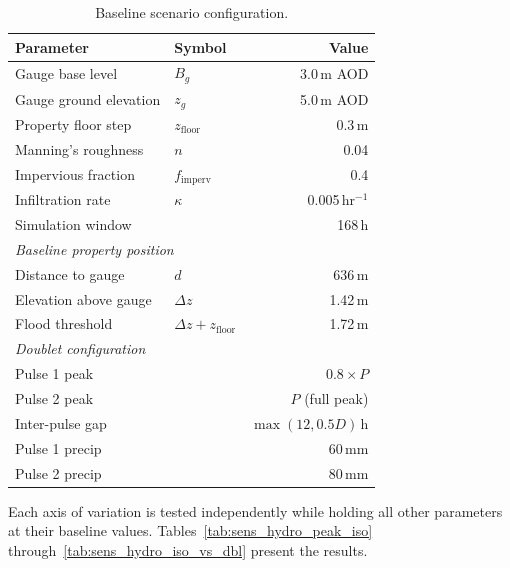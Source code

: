 \documentclass[11pt,a4paper]{article}
\begin{document}
\begin{table}[H]
    \centering
    \caption{Baseline scenario configuration.}
    \label{tab:baseline_config}
    \begin{tabular}{llr}
        \toprule
        \textbf{Parameter} & \textbf{Symbol} & \textbf{Value} \\
        \midrule
        Gauge base level & $B_g$ & 3.0\,m AOD \\
        Gauge ground elevation & $z_g$ & 5.0\,m AOD \\
        Property floor step & $z_{\mathrm{floor}}$ & 0.3\,m \\
        Manning's roughness & $n$ & 0.04 \\
        Impervious fraction & $f_{\mathrm{imperv}}$ & 0.4 \\
        Infiltration rate & $\kappa$ & 0.005\,hr$^{-1}$ \\
        Simulation window & & 168\,h \\
        \midrule
        \multicolumn{3}{l}{\textit{Baseline property position}} \\
        Distance to gauge & $d$ & 636\,m \\
        Elevation above gauge & $\Delta z$ & 1.42\,m \\
        Flood threshold & $\Delta z + z_{\mathrm{floor}}$ & 1.72\,m \\
        \midrule
        \multicolumn{3}{l}{\textit{Doublet configuration}} \\
        Pulse 1 peak & & $0.8 \times P$ \\
        Pulse 2 peak & & $P$ (full peak) \\
        Inter-pulse gap & & $\max(12, 0.5 D)$\,h \\
        Pulse 1 precip & & 60\,mm \\
        Pulse 2 precip & & 80\,mm \\
        \bottomrule
    \end{tabular}
\end{table}

\noindent Each axis of variation is tested independently while holding all other
parameters at their baseline values.  Tables~\ref{tab:sens_hydro_peak_iso}
through~\ref{tab:sens_hydro_iso_vs_dbl} present the results.

\mkmsensitivity
\end{document}
